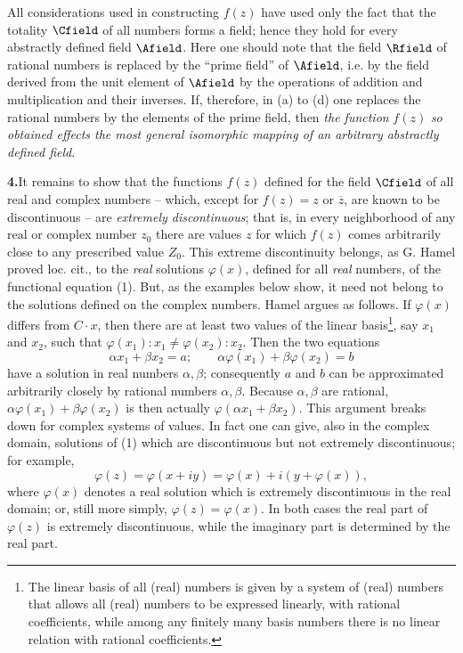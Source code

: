 All considerations used in constructing \(f(z)\) have used only the fact that the totality \(\Cfield\) of all numbers forms a field; hence they hold for every abstractly defined field \(\Afield\). Here one should note that the field \(\Rfield\) of rational numbers is replaced by the ``prime field'' of \(\Afield\), i.e. by the field derived from the unit element of \(\Afield\) by the operations of addition and multiplication and their inverses. If, therefore, in (a) to (d) one replaces the rational numbers by the elements of the prime field, then \emph{the function} \(f(z)\) \emph{so obtained effects the most general isomorphic mapping of an arbitrary abstractly defined field}.

\medskip
\noindent\textbf{4.}\quad It remains to show that the functions \(f(z)\) defined for the field \(\Cfield\) of all real and complex numbers -- which, except for \(f(z)=z\) or \(\overline z\), are known to be discontinuous -- are \emph{extremely discontinuous}; that is, in every neighborhood of any real or complex number \(z_0\) there are values \(z\) for which \(f(z)\) comes arbitrarily close to any prescribed value \(Z_0\). This extreme discontinuity belongs, as G. Hamel proved loc. cit., to the \emph{real} solutions \(\varphi(x)\), defined for all \emph{real} numbers, of the functional equation (1). But, as the examples below show, it need not belong to the solutions defined on the complex numbers. Hamel argues as follows. If \(\varphi(x)\) differs from \(C\cdot x\), then there are at least two values of the linear basis\footnote{The linear basis of all (real) numbers is given by a system of (real) numbers that allows all (real) numbers to be expressed linearly, with rational coefficients, while among any finitely many basis numbers there is no linear relation with rational coefficients.}, say \(x_1\) and \(x_2\), such that \(\varphi(x_1):x_1\ne\varphi(x_2):x_2\). Then the two equations
\[
\alpha x_1+\beta x_2=a;\qquad \alpha\varphi(x_1)+\beta\varphi(x_2)=b
\]
have a solution in real numbers \(\alpha,\beta\); consequently \(a\) and \(b\) can be approximated arbitrarily closely by rational numbers \(\alpha,\beta\). Because \(\alpha,\beta\) are rational, \(\alpha\varphi(x_1)+\beta\varphi(x_2)\) is then actually \(\varphi(\alpha x_1+\beta x_2)\). This argument breaks down for complex systems of values. In fact one can give, also in the complex domain, solutions of (1) which are discontinuous but not extremely discontinuous; for example,
\[
\varphi(z)=\varphi(x+iy)=\varphi(x)+i(y+\varphi(x)),
\]
where \(\varphi(x)\) denotes a real solution which is extremely discontinuous in the real domain; or, still more simply, \(\varphi(z)=\varphi(x)\). In both cases the real part of \(\varphi(z)\) is extremely discontinuous, while the imaginary part is determined by the real part.

